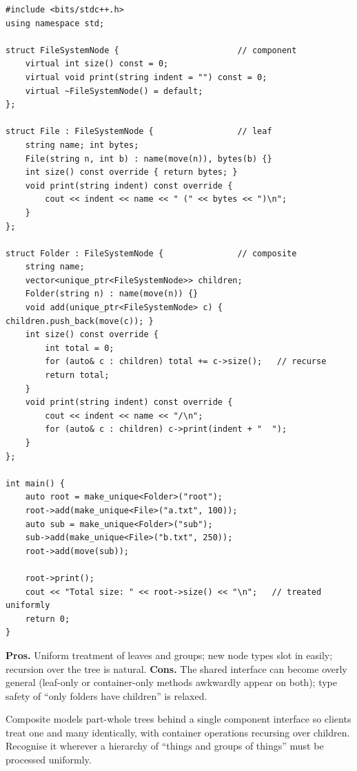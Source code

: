 \begin{lstlisting}
#include <bits/stdc++.h>
using namespace std;

struct FileSystemNode {                        // component
    virtual int size() const = 0;
    virtual void print(string indent = "") const = 0;
    virtual ~FileSystemNode() = default;
};

struct File : FileSystemNode {                 // leaf
    string name; int bytes;
    File(string n, int b) : name(move(n)), bytes(b) {}
    int size() const override { return bytes; }
    void print(string indent) const override {
        cout << indent << name << " (" << bytes << ")\n";
    }
};

struct Folder : FileSystemNode {               // composite
    string name;
    vector<unique_ptr<FileSystemNode>> children;
    Folder(string n) : name(move(n)) {}
    void add(unique_ptr<FileSystemNode> c) { children.push_back(move(c)); }
    int size() const override {
        int total = 0;
        for (auto& c : children) total += c->size();   // recurse
        return total;
    }
    void print(string indent) const override {
        cout << indent << name << "/\n";
        for (auto& c : children) c->print(indent + "  ");
    }
};

int main() {
    auto root = make_unique<Folder>("root");
    root->add(make_unique<File>("a.txt", 100));
    auto sub = make_unique<Folder>("sub");
    sub->add(make_unique<File>("b.txt", 250));
    root->add(move(sub));

    root->print();
    cout << "Total size: " << root->size() << "\n";   // treated uniformly
    return 0;
}
\end{lstlisting}

\begin{complexitybox}
\textbf{Pros.} Uniform treatment of leaves and groups; new node types slot
in easily; recursion over the tree is natural. \textbf{Cons.} The shared
interface can become overly general (leaf-only or container-only methods
awkwardly appear on both); type safety of ``only folders have children''
is relaxed.
\end{complexitybox}

\begin{takeawaybox}
Composite models part-whole trees behind a single component interface so
clients treat one and many identically, with container operations
recursing over children. Recognise it wherever a hierarchy of ``things and
groups of things'' must be processed uniformly.
\end{takeawaybox}
